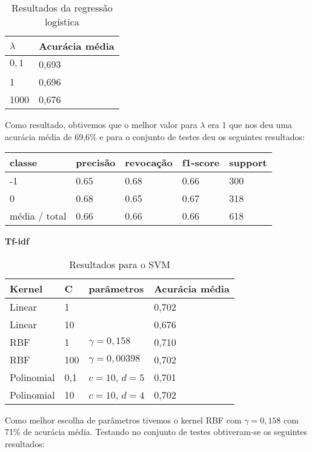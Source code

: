 \begin{table}[H]
	\centering
	\caption{Resultados da regressão logística}
	\begin{tabular}{l l}
		\hline
		$\lambda$ & Acurácia média \\
		\hline
		$0,1$ & 0,693 \\
		\hline
		1 & 0,696 \\
		\hline
		1000 & 0,676 \\
	\end{tabular}
\end{table}

Como resultado, obtivemos que o melhor valor para $\lambda$ era 1 que nos deu uma acurácia
média de 69,6\% e para o conjunto de testes deu os seguintes resultados:

\begin{table}[H]
	\centering
		\begin{tabular}{l | l | l | l | l}
		\hline
		classe  	&	precisão  &  revocação &  f1-score &  support \\
		\hline
		 -1    &   0.65   &   0.68   &   0.66   &    300 \\
		 \hline
          0    &   0.68   &   0.65   &   0.67   &    318 \\
		\hline
		média / total   &    0.66   &   0.66   &   0.66   &    618 \\
		\hline
	\end{tabular}
\end{table}


\textbf{Tf-idf}

\begin{table}[H]
	\centering
	\caption{Resultados para o SVM}
	\begin{tabular}{l l l l}
		\hline
		Kernel & C & parâmetros & Acurácia média \\
		\hline
		Linear & 1 & & 0,702 \\
		\hline
		Linear & 10 & & 0,676 \\
		\hline
		RBF & 1 & $\gamma = 0,158$ & 0,710 \\
		\hline
		RBF & 100 & $\gamma = 0,00398$ & 0,702 \\
		\hline
		Polinomial & 0,1 & $c = 10$, $d = 5$ & 0,701 \\
		\hline
		Polinomial & 10 & $c = 10$, $d = 4$ & 0,702 \\
		\hline
	\end{tabular}
\end{table}

Como melhor escolha de parâmetros tivemos o kernel RBF com $\gamma = 0,158$ com 71\% de
acurácia média. Testando no conjunto de testes obtiveram-se os seguintes resultados:

